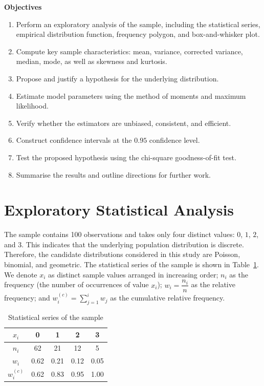 \documentclass[final,3p,times,onecolumn]{elsarticle}
\begin{document}
\textbf{Objectives}

\begin{enumerate}
    \item Perform an exploratory analysis of the sample, including the statistical series, empirical distribution function, frequency polygon, and box-and-whisker plot.
    
    \item Compute key sample characteristics: mean, variance, corrected variance, median, mode, as well as skewness and kurtosis.
    
    \item Propose and justify a hypothesis for the underlying distribution.
    
    \item Estimate model parameters using the method of moments and maximum likelihood.
    
    \item Verify whether the estimators are unbiased, consistent, and efficient.
    
    \item Construct confidence intervals at the $0.95$ confidence level.
    
    \item Test the proposed hypothesis using the chi-square goodness-of-fit test.
    
    \item Summarise the results and outline directions for further work.
\end{enumerate}

\section{Exploratory Statistical Analysis}

The sample contains 100 observations and takes only four distinct values: $0$, $1$, $2$, and $3$. 
This indicates that the underlying population distribution is discrete. 
Therefore, the candidate distributions considered in this study are Poisson, binomial, and geometric.
The statistical series of the sample is shown in Table~\ref{tab:stats-series}.
We denote $x_i$ as distinct sample values arranged in increasing order; $n_i$ as the frequency (the number of occurrences of value $x_i$); 
$w_i = \dfrac{n_i}{n}$ as the relative frequency; and 
$w_i^{(c)} = \sum_{j=1}^{i} w_j$ as the cumulative relative frequency.
\begin{table}[ht!]
\centering
\setlength{\tabcolsep}{13pt}
\renewcommand{\arraystretch}{1.1}
\caption{Statistical series of the sample}
\label{tab:stats-series}
\begin{tabular}{ccccc}
\toprule
$x_i$ & 0 & 1 & 2 & 3 \\
\midrule
$n_i$ & 62 & 21 & 12 & 5 \\
$w_i$ & 0.62 & 0.21 & 0.12 & 0.05 \\
$w_i^{(c)}$ & 0.62 & 0.83 & 0.95 & 1.00 \\
\bottomrule
\end{tabular}
\end{table}
\end{document}
